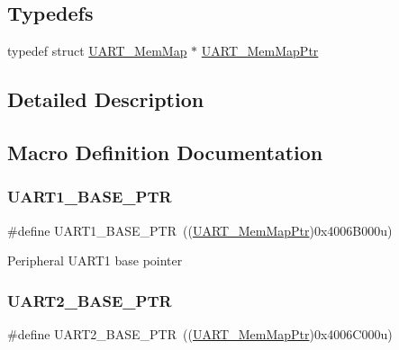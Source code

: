 \subsection*{Typedefs}
\begin{DoxyCompactItemize}
\item 
typedef struct \hyperlink{struct_u_a_r_t___mem_map}{U\+A\+R\+T\+\_\+\+Mem\+Map} $\ast$ \hyperlink{group___u_a_r_t___peripheral_ga306cf44b593fadbb29a065f42e3f68f0}{U\+A\+R\+T\+\_\+\+Mem\+Map\+Ptr}
\end{DoxyCompactItemize}


\subsection{Detailed Description}


\subsection{Macro Definition Documentation}
\mbox{\label{group___u_a_r_t___peripheral_gafb5b1236c1cdf2d9a6464251b791030c}} 
\subsubsection{\texorpdfstring{U\+A\+R\+T1\+\_\+\+B\+A\+S\+E\+\_\+\+P\+TR}{UART1\_BASE\_PTR}}
{\footnotesize\ttfamily \#define U\+A\+R\+T1\+\_\+\+B\+A\+S\+E\+\_\+\+P\+TR~((\hyperlink{group___u_a_r_t___peripheral_ga306cf44b593fadbb29a065f42e3f68f0}{U\+A\+R\+T\+\_\+\+Mem\+Map\+Ptr})0x4006\+B000u)}

Peripheral U\+A\+R\+T1 base pointer \mbox{\label{group___u_a_r_t___peripheral_ga75ca2ea4e490b3c1c7aa55fc9c25cd37}} 
\subsubsection{\texorpdfstring{U\+A\+R\+T2\+\_\+\+B\+A\+S\+E\+\_\+\+P\+TR}{UART2\_BASE\_PTR}}
{\footnotesize\ttfamily \#define U\+A\+R\+T2\+\_\+\+B\+A\+S\+E\+\_\+\+P\+TR~((\hyperlink{group___u_a_r_t___peripheral_ga306cf44b593fadbb29a065f42e3f68f0}{U\+A\+R\+T\+\_\+\+Mem\+Map\+Ptr})0x4006\+C000u)}


